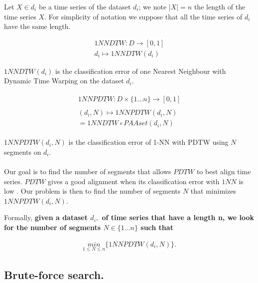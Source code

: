 Let $X \in d_i$ be a time series of the dataset $d_i$; we note $|X| = n$ the length of the time series $X$. For simplicity of notation we suppose that all the time series of $d_i$ have the same length.

\begin{definition}
\begin{eqnarray}
 1NNDTW: D \rightarrow [0, 1] \\
  d_i\mapsto 1NNDTW(d_i)
\end{eqnarray}


 $1NNDTW(d_i)$ is the classification error of one Nearest Neighbour with Dynamic Time Warping on the dataset $d_i$.
\end{definition}




\begin{definition}
\begin{eqnarray}
\begin{array}{l}
 1NNPDTW: D\times\{1 \ldots n\}\rightarrow [0, 1]\\
 \\
(d_i, N)\mapsto 1NNPDTW(d_i, N) \\
 =  1NNDTW \circ PAAset ( d_i, N) 
\end{array}
\end{eqnarray}
\end{definition}

$1NNPDTW( d_i, N)$  is the classification error of 1-NN with PDTW using $N$ segments on 
 $d_i$.

\paragraph{}Our goal is to find the number of segments that allows $PDTW$ to best align
time series.  $PDTW$ gives a good alignment when its
classification error with $1NN$ is low
\cite{Rakthanmanon_Campana_Mueen_Batista_Westover_Zhu_Zakaria_Keogh_2012}.  Our
problem is then to find the number of segments $N$ that minimizes $1NNPDTW(d_i,
N)$.

Formally, \textbf{ given a dataset $d_i,$ of time series that have a length n, we look for the number
of segments $N \in \{1 \ldots n \}$ such that}

\begin{eqnarray}
\underset{1\leq N\leq n}{min}\{1NNPDTW(d_i,N)\}.
\end{eqnarray}


\subsection{Brute-force search.}

